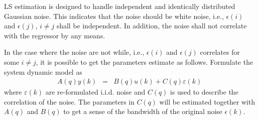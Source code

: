 LS estimation is designed to handle independent and identically distributed Gaussian noise. This indicates that the noise should be white noise, i.e., $\epsilon(i)$ and $\epsilon(j)$, $i\neq j$ shall be independent. In addition, the noise shall not correlate with the regressor by any means.

In the case where the noise are not while, i.e., $\epsilon(i)$ and $\epsilon(j)$ correlates for some $i \neq j$, it is possible to get the parameters estimate as follows. Formulate the system dynamic model as
\begin{eqnarray}
  A(q)y(k) &=& B(q)u(k) + C(q)\varepsilon(k) \nonumber
\end{eqnarray}
where $\varepsilon(k)$ are re-formulated i.i.d. noise and $C(q)$ is used to describe the correlation of the noise. The parameters in $C(q)$ will be estimated together with $A(q)$ and $B(q)$ to get a sense of the bandwidth of the original noise $\epsilon(k)$.















